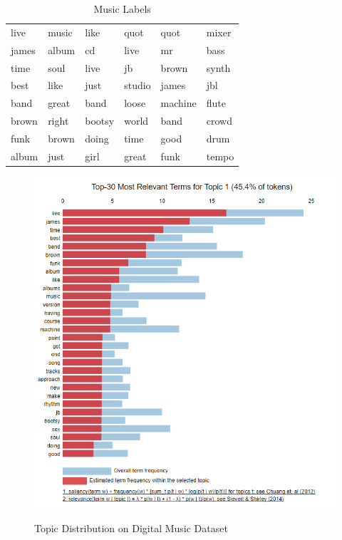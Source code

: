 \begin{table}[h]
\centering
\begin{tabular}{ llllll }
\midrule
live  & music  &  like  & quot  & quot & mixer \\
james  & album  &  cd  & live  & mr  & bass \\
time  & soul &  live  & jb  & brown  & synth \\ 
best  & like  &  just  & studio  & james & jbl \\ 
band  & great  &  band  & loose  & machine & flute \\ 
brown & right  &  bootsy  & world & band & crowd \\ 
funk  & brown   &  doing  &  time  &  good & drum \\ 
album  & just   &  girl & great &  funk  & tempo \\ 
\bottomrule          
\end{tabular}
\caption{Music Labels}
\label{Music Labels}
\end{table}



\begin{figure}[H]
  {\includegraphics[width = 0.85 \textwidth]{img/lda/1a.PNG}}
  \caption{Topic Distribution on Digital Music Dataset}
\end{figure}


